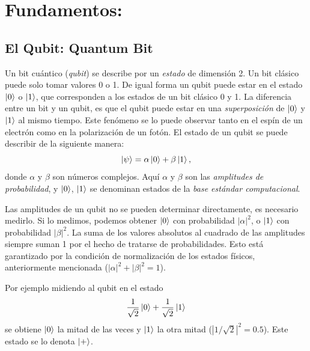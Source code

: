 \chapter{Fundamentos:}

\section{El Qubit: Quantum Bit}
Un bit cuántico (\emph{qubit}) se describe por un \emph{estado} de dimensión 2. 
Un bit  clásico puede solo tomar valores 0 o 1. De igual forma un qubit puede estar en el estado $\ket{0}$ o $\ket{1}$, que corresponden a los estados de un bit clásico 0 y 1. La diferencia entre un bit y un qubit, es que el qubit puede estar en una \emph{superposición} de $\ket{0}$ y $\ket{1}$ al mismo tiempo.
Este fenómeno se lo puede observar tanto en el espín de un electrón como en la polarización de un fotón. El estado de un qubit se puede describir de la siguiente manera:
\begin{equation}
  \ket{\psi} = \alpha\ket{0} + \beta\ket{1},
\end{equation}
donde $\alpha$ y $\beta$ son números complejos. Aquí $\alpha$ y $\beta$ son las \emph{amplitudes de probabilidad}, y $\ket{0}$, $\ket{1}$ se denominan estados de la \emph{base estándar computacional}.

Las amplitudes de un qubit no se pueden determinar directamente, es necesario medirlo. Si lo medimos, podemos obtener $\ket{0}$ con probabilidad $|\alpha|^2$, o $\ket{1}$ con probabilidad $|\beta|^2$. 
La suma de los valores absolutos al cuadrado de las amplitudes siempre suman 1 por el hecho de tratarse de probabilidades. Esto está garantizado por la condición de normalización de los estados físicos, anteriormente mencionada ($|\alpha|^2 + |\beta|^2 = 1$).

Por ejemplo midiendo al qubit en el estado
\begin{equation}
  \dfrac{1}{\sqrt2}\ket{0}+\dfrac{1}{\sqrt2}\ket{1}
\end{equation}
se obtiene $\ket{0}$ la mitad de las veces y $\ket{1}$ la otra mitad ($|1/\sqrt2|^2 = 0.5$). Este estado se lo denota $\ket{+}$.

